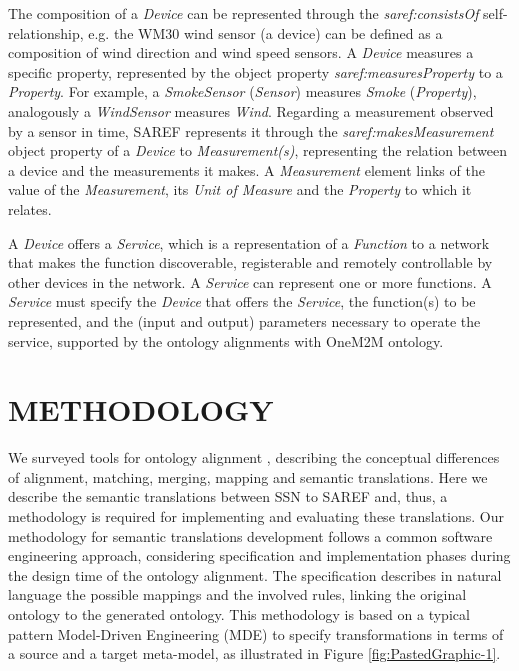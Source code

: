 \documentclass{sig-alternate-05-2015}
\begin{document}
The composition of a \textit{Device} can be represented through the \textit{saref:\-consistsOf} self-relationship, e.g. the WM30 wind sensor (a device) can be defined as a composition of wind direction and wind speed sensors. A \textit{Device} measures a specific property, represented by the object property \textit{saref:\-measuresProperty} to a \textit{Property}. For example, a \textit{SmokeSensor} (\textit{Sensor}) measures \textit{Smoke} (\textit{Property}), analogously a \textit{WindSensor} measures \textit{Wind}. Regarding a measurement observed by a sensor in time, SAREF represents it through the \textit{saref:\-makesMeasurement} object property of a \textit{Device} to \textit{Measurement(s)}, representing the relation between a device and the measurements it makes. A \textit{Measurement} element links of the value of the \textit{Measurement}, its \textit{Unit of Measure} and the \textit{Property} to which it relates. 

A \textit{Device} offers a \textit{Service}, which is a representation of a \textit{Function} to a network that makes the function discoverable, registerable and remotely controllable by other devices in the network. A \textit{Service} can represent one or more functions. A \textit{Service} must specify the \textit{Device} that offers the \textit{Service}, the function(s) to be represented, and the (input and output) parameters necessary to operate the service, supported by the ontology alignments with OneM2M ontology.


\section{METHODOLOGY}
We surveyed tools for ontology alignment \cite{Ganzha2015}, describing the conceptual differences of alignment, matching, merging, mapping and semantic translations. Here we describe the semantic translations between SSN to SAREF and, thus, a methodology is required for implementing and evaluating these translations. Our methodology for semantic translations development follows a common software engineering approach, considering specification and implementation phases during the design time of the ontology alignment. The specification describes in natural language the possible mappings and the involved rules, linking the original ontology to the generated ontology. This methodology is based on a typical pattern Model-Driven Engineering (MDE) \cite{Brambilla2012} to specify transformations in terms of a source and a target meta-model, as illustrated in Figure \ref{fig:PastedGraphic-1}.
\end{document}
